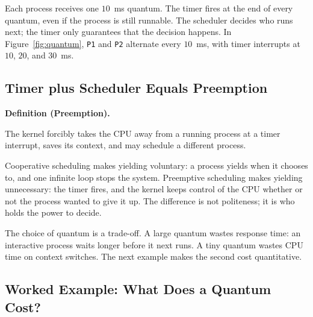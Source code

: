 \documentclass[11pt]{article}
\newenvironment{definitionbox}[1]{%
  \par\noindent\textbf{Definition (#1).}\ \itshape
}{\par\vspace{0.3em}}
\begin{document}
Each process receives one $10$~ms quantum. The timer fires at the end of every
quantum, even if the process is still runnable. The scheduler decides who runs
next; the timer only guarantees that the decision happens. In
Figure~\ref{fig:quantum}, \texttt{P1} and \texttt{P2} alternate every $10$~ms,
with timer interrupts at $10$, $20$, and $30$~ms.

\subsection{Timer plus Scheduler Equals Preemption}

\begin{definitionbox}{Preemption}
The kernel forcibly takes the CPU away from a running process at a timer
interrupt, saves its context, and may schedule a different process.
\end{definitionbox}

Cooperative scheduling makes yielding voluntary: a process yields when it
chooses to, and one infinite loop stops the system. Preemptive scheduling makes
yielding unnecessary: the timer fires, and the kernel keeps control of the CPU
whether or not the process wanted to give it up. The difference is not
politeness; it is who holds the power to decide.

The choice of quantum is a trade-off. A large quantum wastes response time: an
interactive process waits longer before it next runs. A tiny quantum wastes CPU
time on context switches. The next example makes the second cost quantitative.

\subsection{Worked Example: What Does a Quantum Cost?}
\end{document}

